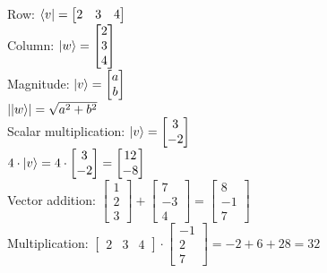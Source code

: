 \begin{example}
  Row: $\langle v\rvert = \begin{bmatrix}
    2 & 3 & 4
  \end{bmatrix}$\\
  Column: $\lvert w\rangle = 
  \begin{bmatrix}
    2\\
    3\\
    4
  \end{bmatrix}
  $\\
  Magnitude: $\lvert v\rangle = 
  \begin{bmatrix}
    a\\
    b\\
  \end{bmatrix}$\\
  $\lvert\lvert w\rangle\rvert = \sqrt{a^2 + b^2}$\\
  Scalar multiplication: $\lvert v\rangle = 
  \begin{bmatrix}
    3\\
    -2
  \end{bmatrix}$\\
  $4 \cdot \lvert v\rangle = 4 \cdot
  \begin{bmatrix}
    3\\
    -2
  \end{bmatrix} = \begin{bmatrix}
    12\\
    -8
  \end{bmatrix}$\\
  Vector addition: $\begin{bmatrix}
    1\\
    2\\
    3
  \end{bmatrix} + \begin{bmatrix}
    7\\
    -3\\
    4
  \end{bmatrix} = \begin{bmatrix}
    8\\
    -1\\
    7
  \end{bmatrix}$\\
  Multiplication: $\begin{bmatrix}
    2 & 3 & 4
  \end{bmatrix} \cdot \begin{bmatrix}
    -1\\
    2\\
    7
  \end{bmatrix} = -2 + 6 + 28 = 32$\\
\end{example}


